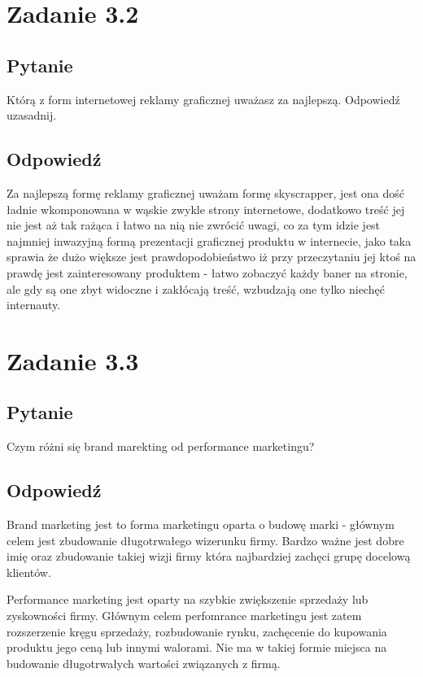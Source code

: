 \documentclass[paper=a4, fontsize=11pt]{scrartcl} %
\numberwithin{equation}{section} %
\numberwithin{figure}{section} %
\numberwithin{table}{section} %
\begin{document}
\section{Zadanie 3.2}

\subsection {Pytanie}

Którą z form internetowej reklamy graficznej uważasz za najlepszą. Odpowiedź uzasadnij.

\subsection {Odpowiedź}

Za najlepszą formę reklamy graficznej uważam formę skyscrapper, jest ona dość ładnie wkomponowana w wąskie zwykle
strony internetowe, dodatkowo treść jej nie jest aż tak rażąca i łatwo na nią nie zwrócić uwagi, co za tym idzie
jest najmniej inwazyjną formą prezentacji graficznej produktu w internecie, jako taka sprawia że dużo większe jest
prawdopodobieństwo iż przy przeczytaniu jej ktoś na prawdę jest zainteresowany produktem - łatwo zobaczyć każdy baner
na stronie, ale gdy są one zbyt widoczne i zakłócają treść, wzbudzają one tylko niechęć internauty.

\section{Zadanie 3.3}

\subsection {Pytanie}

Czym różni się brand marekting od performance marketingu?

\subsection {Odpowiedź}

Brand marketing jest to forma marketingu oparta o budowę marki - głównym celem jest zbudowanie długotrwałego wizerunku
firmy. Bardzo ważne jest dobre imię oraz zbudowanie takiej wizji firmy która najbardziej zachęci grupę docelową klientów.

Performance marketing jest oparty na szybkie zwiększenie sprzedaży lub zyskowności firmy. Głównym celem perfomrance marketingu
jest zatem rozszerzenie kręgu sprzedaży, rozbudowanie rynku, zachęcenie do kupowania produktu jego ceną lub innymi walorami.
Nie ma w takiej formie miejsca na budowanie długotrwałych wartości związanych z firmą.
\end{document}

